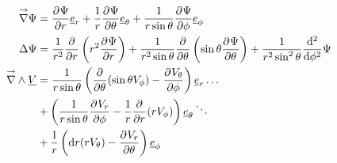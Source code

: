 \begin{align*}
\vgrad \Psi &= \ddr{r}{\Psi} \v e_r + \frac{1}{r}\ddr{\theta}{\Psi}\v e_\theta + \frac{1}{r\sin\theta}\ddr{\phi}{\Psi} \v e_\phi\\
 \Delta \Psi & = \frac{1}{r^2}\ddr{r}{}\left(r^2\ddr{r}{\Psi}\right)
+ \frac{1}{r^2\sin\theta}\ddr{\theta}{}\left(\sin\theta\ddr{\theta}{\Psi}\right)
+ \frac{1}{r^2\sin^2\theta}\frac{\dd^2}{\dd\phi^2}\Psi \\
\vrot \v V &= \frac{1}{r\sin\theta}\left(\ddr{\theta}{}(\sin\theta V_\phi)-\ddr{\phi}{V_\theta}\right)\v e_r \dots\\
&+ \left(\frac{1}{r\sin\theta}\ddr{\phi}{V_r} - \frac{1}{r}\ddr{r}{}(rV_\phi)\right) \v e_\theta \ddots \\
&+ \frac{1}{r}\left( \dd{r}{}(rV_\theta) - \ddr{\theta}{V_r}\right)\v e_\phi
\end{align*}


